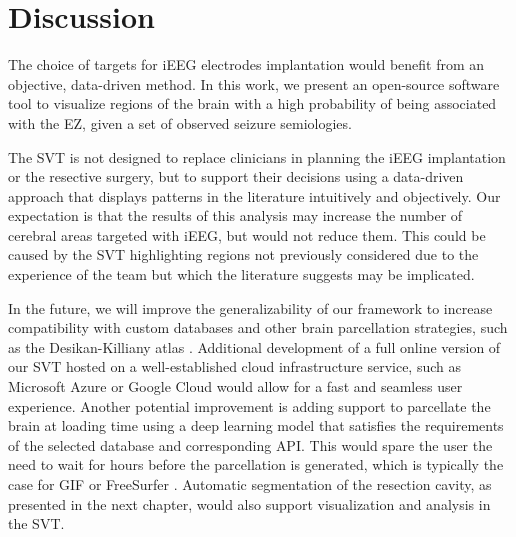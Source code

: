 \section{Discussion}
\label{sec:svt_discussion}

The choice of targets for \ac{iEEG} electrodes implantation would benefit from an objective, data-driven method.
In this work, we present an open-source software tool to visualize regions of the brain with a high probability of being associated with the \ac{EZ}, given a set of observed seizure semiologies.

The \ac{SVT} is not designed to replace clinicians in planning the \ac{iEEG} implantation or the resective surgery, but to support their decisions using a data-driven approach that displays patterns in the literature intuitively and objectively.
Our expectation is that the results of this analysis may increase the number of cerebral areas targeted with \ac{iEEG}, but would not reduce them.
This could be caused by the \ac{SVT} highlighting regions not previously considered due to the experience of the team but which the literature suggests may be implicated.  %

In the future, we will improve the generalizability of our framework to increase compatibility with custom databases and other brain parcellation strategies, such as the Desikan-Killiany atlas \cite{desikan_automated_2006}.
Additional development of a full online version of our \ac{SVT} hosted on a well-established cloud infrastructure service, such as Microsoft Azure or Google Cloud would allow for a fast and seamless user experience.
Another potential improvement is adding support to parcellate the brain at loading time using a deep learning model \cite{li_compactness_2017,perez-garcia_fepegarhighresnet_2019} that satisfies the requirements of the selected database and corresponding \ac{API}.
This would spare the user the need to wait for hours before the parcellation is generated, which is typically the case for \ac{GIF} \cite{cardoso_geodesic_2015} or FreeSurfer%
.
Automatic segmentation of the resection cavity, as presented in the next chapter, would also support visualization and analysis in the \ac{SVT}.
